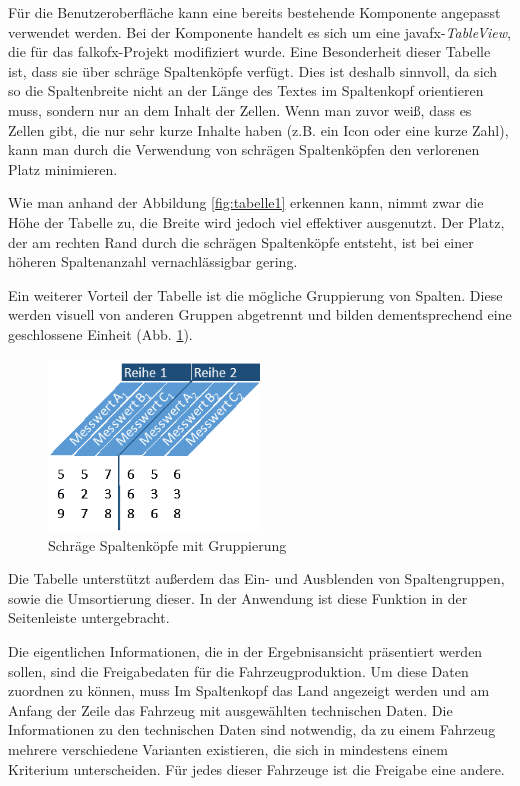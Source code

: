 Für die Benutzeroberfläche kann eine bereits bestehende Komponente angepasst verwendet werden. Bei der Komponente handelt es sich um eine \gls{javafx}-\textit{TableView}, die für das \gls{falkofx}-Projekt modifiziert wurde. Eine Besonderheit dieser Tabelle ist, dass sie über schräge Spaltenköpfe verfügt. Dies ist deshalb sinnvoll, da sich so die Spaltenbreite nicht an der Länge des Textes im Spaltenkopf orientieren muss, sondern nur an dem Inhalt der Zellen. Wenn man zuvor weiß, dass es Zellen gibt, die nur sehr kurze Inhalte haben (z.B. ein Icon oder eine kurze Zahl), kann man durch die Verwendung von schrägen Spaltenköpfen den verlorenen Platz minimieren.

Wie man anhand der Abbildung \ref{fig:tabelle1} erkennen kann, nimmt zwar die Höhe der Tabelle zu, die Breite wird jedoch viel effektiver ausgenutzt. Der Platz, der am rechten Rand durch die schrägen Spaltenköpfe entsteht, ist bei einer höheren Spaltenanzahl vernachlässigbar gering.

Ein weiterer Vorteil der Tabelle ist die mögliche Gruppierung von Spalten. Diese werden visuell von anderen Gruppen abgetrennt und bilden dementsprechend eine geschlossene Einheit (Abb. \ref{fig:tabelle2}).

\begin{figure}[H]
 \centering
 \includegraphics[width=0.5\textwidth]{grafiken/Tabelle_Grouped.png}
 \caption{Schräge Spaltenköpfe mit Gruppierung}
 \label{fig:tabelle2}
\end{figure}

Die Tabelle unterstützt außerdem das Ein- und Ausblenden von Spaltengruppen, sowie die Umsortierung dieser. In der Anwendung ist diese Funktion in der Seitenleiste untergebracht.

Die eigentlichen Informationen, die in der Ergebnisansicht präsentiert werden sollen, sind die Freigabedaten für die Fahrzeugproduktion. Um diese Daten zuordnen zu können, muss Im Spaltenkopf das Land angezeigt werden und am Anfang der Zeile das Fahrzeug mit ausgewählten technischen Daten. Die Informationen zu den technischen Daten sind notwendig, da zu einem Fahrzeug mehrere verschiedene Varianten existieren, die sich in mindestens einem Kriterium unterscheiden. Für jedes dieser Fahrzeuge ist die Freigabe eine andere. 


